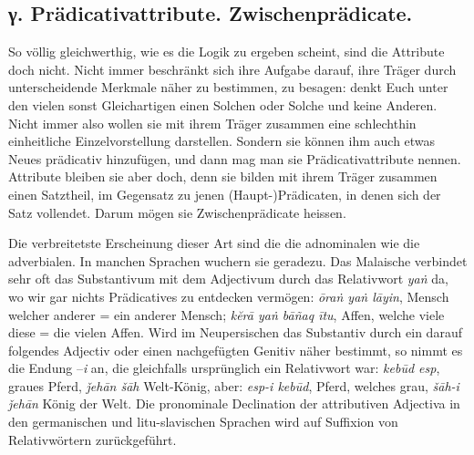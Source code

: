 \subsection*{γ. Prädicativattribute. Zwischenprädicate.}\label{IV.IV.Icgamma}

So völlig gleichwerthig, wie es die Logik zu ergeben scheint, sind die Attribute doch nicht. Nicht immer beschränkt sich ihre Aufgabe darauf, ihre Träger durch unterscheidende Merkmale näher zu bestimmen, zu besagen: denkt Euch unter den vielen sonst Gleichartigen einen Solchen oder Solche und keine Anderen. Nicht immer also wollen sie mit ihrem Träger zusammen eine schlechthin einheitliche Einzelvorstellung darstellen. Sondern sie können ihm auch etwas Neues prädicativ hinzufügen, und dann mag man sie Prädicativattribute nennen. Attribute bleiben sie aber doch, denn sie bilden mit ihrem Träger zu\label{sp.457}sammen einen Satztheil, im Gegensatz zu jenen (Haupt-)Prädicaten, in denen sich der Satz vollendet. Darum mögen sie Zwischenprädicate heissen.

Die verbreitetste Erscheinung dieser Art sind die  die \label{fp.437} adnominalen wie die adverbialen. In manchen Sprachen wuchern sie geradezu. Das Malaische verbindet sehr oft das Substantivum mit dem Adjectivum durch das Relativwort \textit{yaṅ} da, wo wir gar nichts Prädicatives zu entdecken vermögen: \textit{ōraṅ yaṅ lāyin}, Mensch welcher anderer = ein anderer Mensch; \textit{kĕrā yaṅ bāñaq ītu}, Affen, welche viele diese = die vielen Affen.  Wird im Neupersischen das Substantiv durch ein darauf folgendes Adjectiv oder einen nachgefügten Genitiv näher bestimmt, so nimmt es die Endung –\textit{i} an, die gleichfalls ursprünglich ein Relativwort war: \textit{kebūd esp}, graues Pferd, \textit{ǰehān šāh} Welt-König, aber: \textit{esp-i kebūd}, Pferd, welches grau, \textit{šāh-i ǰehān} König der Welt. Die pronominale Declination der attributiven Adjectiva in den germanischen und litu-slavischen Sprachen wird auf Suffixion von Relativwörtern zurückgeführt.

